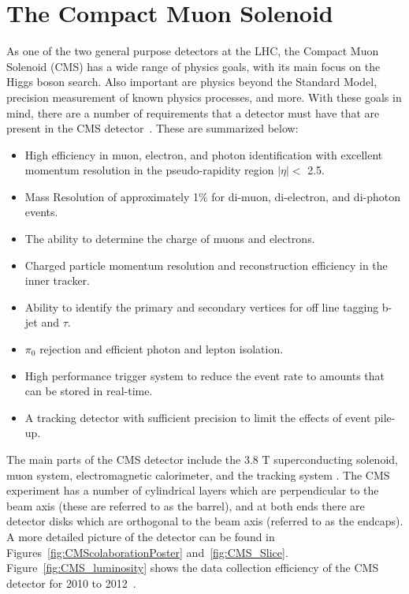 

\section{The Compact Muon Solenoid}

As one of the two general purpose detectors at the LHC, the Compact Muon Solenoid (CMS) has a wide range of physics goals, with its main focus on the Higgs boson search. Also important are physics beyond the Standard Model, precision measurement of known physics processes, and more.  With these goals in mind, there are a number of requirements that a detector must have that are present in the CMS detector~\cite{Bayatian:922757}. These are summarized below:

\begin{itemize}
 \item
   High efficiency in muon, electron, and photon identification with excellent momentum resolution in the pseudo-rapidity region $|\eta| <$ 2.5.
 \item 
   Mass Resolution of approximately 1\% for di-muon, di-electron, and di-photon events.
 \item 
   The ability to determine the charge of muons and electrons.
 \item
   Charged particle momentum resolution and reconstruction efficiency in the inner tracker. 
 \item
   Ability to identify the primary and secondary vertices for off line tagging b-jet and $\tau$.
 \item
  $\pi_0$ rejection and efficient photon and lepton isolation.
 \item
   High performance trigger system to reduce the event rate to amounts that can be stored in real-time.
 \item
   A tracking detector with sufficient precision to limit the effects of event pile-up.
\end{itemize}


  The main parts of the CMS detector include the 3.8 T superconducting solenoid, muon system, electromagnetic calorimeter, and the tracking system \cite{CMSExperiment}.  The CMS experiment has a number of cylindrical layers which are perpendicular to the beam axis (these are referred to as the barrel), and at both ends there are detector disks which are orthogonal to the beam axis (referred to as the endcaps). A more detailed picture of the detector can be found in Figures~\ref{fig:CMScolaborationPoster} and~\ref{fig:CMS_Slice}.  Figure~\ref{fig:CMS_luminosity} shows the data collection efficiency of the CMS detector for 2010 to 2012~\cite{cms_lumi_plots}.



